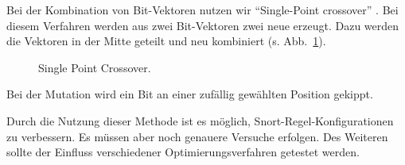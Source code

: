 Bei der Kombination von Bit-Vektoren nutzen wir \enquote{Single-Point
crossover} \cite{mitchel}. Bei diesem Verfahren werden aus zwei
Bit-Vektoren zwei neue erzeugt. Dazu werden die Vektoren in der
Mitte geteilt und neu kombiniert (s. Abb.~\ref{fig:single_point_crossover}).

\begin{figure}
 \centering
 
 \caption{Single Point Crossover. \cite{mitchel}}
 \label{fig:single_point_crossover}
\end{figure}

Bei der Mutation wird ein Bit an einer zufällig gewählten Position
gekippt.

Durch die Nutzung dieser Methode ist es möglich, Snort-Regel-Konfigurationen
zu verbessern. Es müssen aber noch genauere Versuche erfolgen. Des Weiteren
sollte der Einfluss verschiedener Optimierungsverfahren getestet werden.


